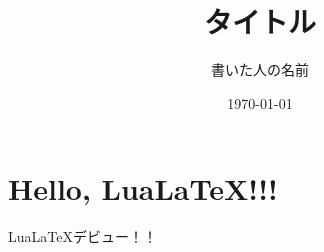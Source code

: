 \documentclass[a4paper, 11pt, lualatex, ja=standard]{bxjsarticle}
\title{\Huge タイトル}
\author{\huge 書いた人の名前}
\date{\today}
\begin{document}
  \maketitle
  \section{Hello, Lua\LaTeX !!!}
    Lua\LaTeX デビュー！！
\end{document}
